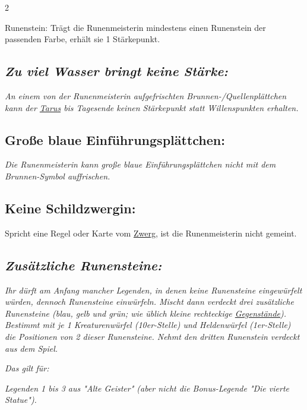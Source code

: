 \documentclass[10pt, a4paper, oneside]{book}
\newcommand{\fan}[1]{\textit{#1}}
\begin{document}
\begin{multicols*}{2}
\begin{nobgcolor}
\bullet{} Runenstein: Trägt die Runenmeisterin mindestens einen Runenstein der passenden Farbe, erhält sie 1 Stärkepunkt.
\supercite{89598}



\subsection{\fan{Zu viel Wasser bringt keine Stärke:}}

\fan{An einem von der Runenmeisterin aufgefrischten Brunnen-/Quellenplättchen kann der \hyperref[tarus]{Tarus} bis Tagesende keinen Stärkepunkt statt Willenspunkten erhalten.}
\supercite{137438}


\columnbreak

\subsection{Große blaue Einführungsplättchen:}

\fan{Die Runenmeisterin kann große blaue Einführungsplättchen nicht mit dem Brunnen-Symbol auffrischen.}




\subsection{Keine Schildzwergin:}

Spricht eine Regel oder Karte vom \hyperref[zwerg]{Zwerg}, ist die Runenmeisterin nicht gemeint.




\columnbreak




\subsection{\fan{Zusätzliche Runensteine:}}

\fan{Ihr dürft am Anfang mancher Legenden, in denen keine Runensteine eingewürfelt würden, dennoch Runensteine einwürfeln. Mischt dann verdeckt drei zusätzliche Runensteine (blau, gelb und grün; wie üblich kleine rechteckige \hyperref[gegenstaende-und-sonderplaettchen]{Gegenstände}). Bestimmt mit je 1 Kreaturenwürfel (10er-Stelle) und Heldenwürfel (1er-Stelle) die Positionen von 2 dieser Runensteine. Nehmt den dritten Runenstein verdeckt aus dem Spiel.}
\supercite{128652}

\fan{Das gilt für:}


\bullet{} \fan{Legenden 1 bis 3 aus "Alte Geister" (aber nicht die Bonus-Legende "Die vierte Statue").}


\end{nobgcolor}
\end{multicols*}
\end{document}
